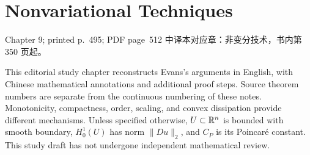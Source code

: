 \chapter{Nonvariational Techniques}
\label{chap:nonvariational-techniques}

\PDESource
  {Chapter 9; printed p.~495; PDF page~512}
  {中译本对应章：非变分技术，书内第 350 页起。}

\noindent This editorial study chapter reconstructs Evans's arguments in English,
with Chinese mathematical annotations and additional proof steps. Source theorem
numbers are separate from the continuous numbering of these notes. Monotonicity,
compactness, order, scaling, and convex dissipation provide different mechanisms.
Unless specified otherwise, $U\subset\mathbb{R}^n$ is bounded with smooth boundary,
$H^1_0(U)$ has norm $\|Du\|_2$, and $C_P$ is its Poincar\'e constant.
This study draft has not undergone independent mathematical review.









